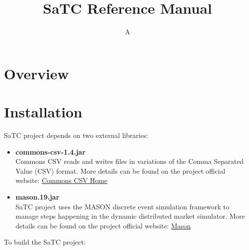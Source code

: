 \documentclass[12pt]{article}
\title {SaTC Reference Manual}
\author {A}
\begin{document}
\maketitle
\newpage
\tableofcontents

\newpage

\section{Overview}

\section {Installation} 
\label{sec:installation}

SaTC project depends on two external libraries: 

\begin{itemize}
    \item{\textbf{commons-csv-1.4.jar}} \\
        Commons CSV reads and writes files in variations of the Comma Separated Value (CSV) format. 
        More details can be found on the project official website: 
        \href{https://commons.apache.org/proper/commons-csv/}{Commons CSV Home}
    \item{\textbf{mason.19.jar}} \\
        SaTC project uses the MASON discrete event simulation framework to manage steps happening 
        in the dynamic distributed market simulator. 
        More details can be found on the project official website: 
        \href{https://cs.gmu.edu/~eclab/projects/mason/}{Mason}
\end{itemize}

\noindent
To build the SaTC project: 
\end{document}
